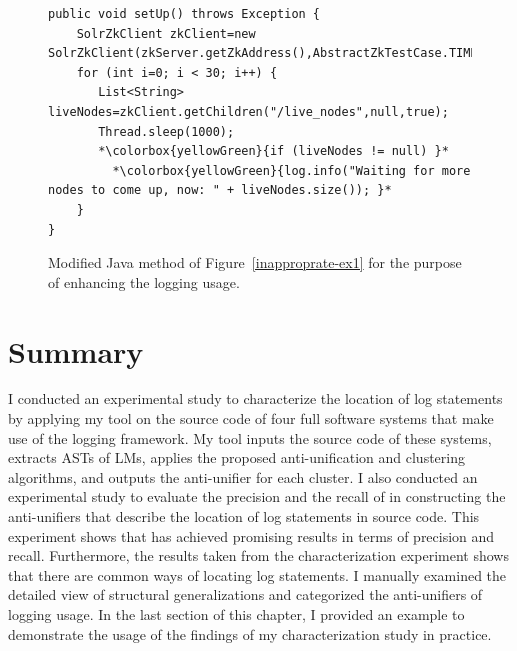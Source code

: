 \begin{figure}[p]
\def\baselinestretch{1}
\begin{lstlisting}[escapechar=*]
public void setUp() throws Exception {
    SolrZkClient zkClient=new SolrZkClient(zkServer.getZkAddress(),AbstractZkTestCase.TIMEOUT);
    for (int i=0; i < 30; i++) {
       List<String> liveNodes=zkClient.getChildren("/live_nodes",null,true);
       Thread.sleep(1000);
       *\colorbox{yellowGreen}{if (liveNodes != null) }*
         *\colorbox{yellowGreen}{log.info("Waiting for more nodes to come up, now: " + liveNodes.size()); }*
    }
}
\end{lstlisting}
\caption[Example 1: An example  for the purpose of enhancing the logging usage in the Java method of Example.]{Modified Java method of Figure~\ref{inapproprate-ex1} for the purpose of enhancing the logging usage.\label{approprate-ex1}}
\end{figure}

\section{Summary}
I conducted an experimental study to characterize the location of log statements by applying my tool on the source code of four full software systems that make use of the  logging framework. My tool inputs the source code of these systems, extracts ASTs of LMs, applies the proposed anti-unification and clustering algorithms, and outputs the anti-unifier for each cluster. I also conducted an experimental study to evaluate the precision and the recall of  in constructing the anti-unifiers that describe the location of log statements in source code. This experiment shows that  has achieved promising results in terms of precision and recall. Furthermore, the results taken from the characterization experiment shows that there are common ways of locating log statements. I manually examined the detailed view of structural generalizations and categorized the anti-unifiers of logging usage. In the last section of this chapter, I provided an example to demonstrate the usage of the findings of my characterization study in practice.




